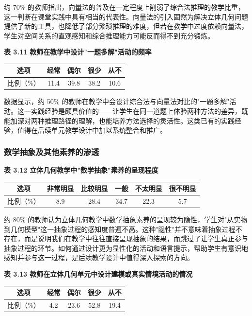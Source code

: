 \documentclass[UTF8,a4paper,12pt,twoside]{ctexart}
\begin{document}
约 70\% 的教师指出，向量法的普及在一定程度上削弱了综合法推理的教学比重，这一判断在课堂实践中具有相当的代表性。向量法的引入固然为解决立体几何问题提供了新的工具，也降低了部分繁琐推理的难度，但若在教学中过度依赖向量法，学生对空间关系的直观感知和综合推理能力可能反而得不到充分锻炼。

\textbf{表 3.11 教师在教学中设计"一题多解"活动的频率}

\begin{center}
\begin{tabular}{|c|c|c|c|c|}
\hline
选项 & 经常 & 偶尔 & 很少 & 从不 \\
\hline
比例（\%） & 11.4 & 39.8 & 38.2 & 10.6 \\
\hline
\end{tabular}
\end{center}

数据显示，约 50\% 的教师在教学中会设计综合法与向量法对比的"一题多解"活动。这一实践经验是颇具价值的——让学生在同一道题上体验两种方法的差异，既能加深对两种推理路径的理解，也能培养方法选择的灵活性。这类已有的实践经验，值得在后续单元教学设计中加以系统整合和推广。

\subsubsection{数学抽象及其他素养的渗透}

\textbf{表 3.12 立体几何教学中"数学抽象"素养的呈现程度}

\begin{center}
\begin{tabular}{|c|c|c|c|c|c|}
\hline
选项 & 非常明显 & 比较明显 & 一般 & 不太明显 & 很不明显 \\
\hline
比例（\%） & 8.9 & 28.4 & 34.7 & 22.3 & 5.7 \\
\hline
\end{tabular}
\end{center}

约 80\% 的教师认为立体几何教学中数学抽象素养的呈现较为隐性，学生对"从实物到几何模型"这一抽象过程的感知度普遍不高。这种"隐性"并不意味着抽象过程不存在，而是说明我们在教学中往往直接呈现抽象的结果，而跳过了让学生真正参与抽象过程的环节。如何通过设计更为显性化的活动和语言提示，帮助学生有意识地感知并参与这一过程，是后续教学设计中值得深入探索的方向。

\textbf{表 3.13 教师在立体几何单元中设计建模或真实情境活动的情况}

\begin{center}
\begin{tabular}{|c|c|c|c|c|}
\hline
选项 & 经常 & 偶尔 & 很少 & 从不 \\
\hline
比例（\%） & 4.2 & 23.6 & 52.8 & 19.4 \\
\hline
\end{tabular}
\end{center}
\end{document}
